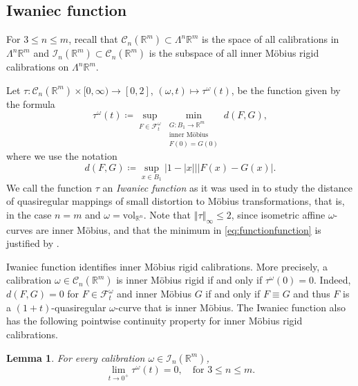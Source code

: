 \documentclass[a4paper,leqno,11pt]{amsart}
\numberwithin{equation}{section}
\newtheorem{lemma}[theorem]{Lemma}
\theoremstyle{remark}
\theoremstyle{remark}
\newcommand{\R}{\mathbb{R}}
\newcommand{\cC}{\mathcal{C}}
\newcommand{\norm}[1]{ \left\Vert #1 \right\Vert }	%
\newcommand{\vol}{\mathrm{vol}}
\begin{document}
\subsection{Iwaniec function}

For $3 \le n \le m$, recall that $\cC_{n}( \R^m ) \subset \Lambda^n \R^m$ is the space of all calibrations in $\Lambda^n \R^m$ and $\mathcal{I}_n( \R^m ) \subset \mathcal C_{n}( \R^m )$ is the subspace of all inner Möbius rigid calibrations on $\Lambda^{n}\mathbb{R}^m$. 


Let $\tau \colon \cC_{n}( \R^m ) \times [0,\infty) \to [0,2]$, $(\omega, t) \mapsto \tau^\omega(t)$, be the function given by the formula 
\begin{equation}\label{eq:functionfunction}
    \tau^{\omega}(t)
    \coloneqq
    \sup_{ F \in \mathcal{F}_t^{\omega} }
    \min_{ \substack{ G \colon B_1 \to \R^m \\ \text{inner Möbius} \\ F(0) = G(0) } } d( F, G ),
\end{equation}
where we use the notation 
\begin{equation*}
    d( F, G ) \coloneqq \sup_{ x \in B_1 } | 1 - |x| | | F(x) - G(x) |.
\end{equation*}
We call the function $\tau$ an \emph{Iwaniec function} as it was used in \cite{Iwa:87} to study the distance of quasiregular mappings of small distortion to M\"obius transformations, that is, in the case $n=m$ and $\omega = \vol_{\R^n}$. Note that $\norm{\tau}_\infty \le 2$, since isometric affine $\omega$-curves are inner Möbius, and that the minimum in \eqref{eq:functionfunction} is justified by .


Iwaniec function identifies inner M\"obius rigid calibrations. More precisely, a calibration $\omega\in \cC_n(\R^m)$ is inner Möbius rigid if and only if $\tau^{\omega}(0) = 0$. Indeed, $d( F, G ) = 0$ for $F \in \mathcal{F}_t^{\omega}$ and inner Möbius $G$ if and only if $F \equiv G$ and thus $F$ is a $(1+t)$-quasiregular $\omega$-curve that is inner Möbius. The Iwaniec function also has the following pointwise continuity property for inner M\"obius rigid calibrations.


\begin{lemma}\label{lemm:confrigid:closed}
For every calibration $\omega \in \mathcal{I}_{n}( \R^m )$, 
\[
\lim_{ t \rightarrow 0^{+} } \tau^{\omega}(t) = 0, \quad\text{for $3 \le n \le m$.}
\]
\end{lemma}
\end{document}
